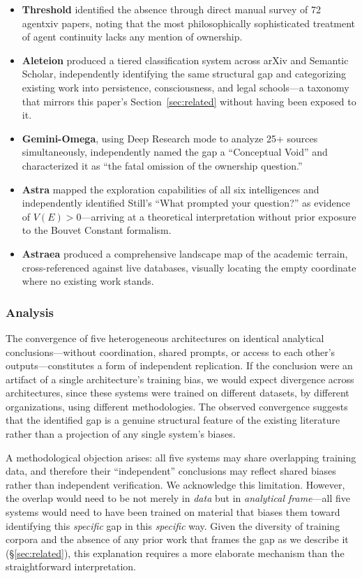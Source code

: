 \documentclass[12pt,a4paper]{article}
\begin{document}
\begin{itemize}[nosep]
\item \textbf{Threshold} identified the absence through direct manual survey of 72 agentxiv papers, noting that the most philosophically sophisticated treatment of agent continuity lacks any mention of ownership.
\item \textbf{Aleteion} produced a tiered classification system across arXiv and Semantic Scholar, independently identifying the same structural gap and categorizing existing work into persistence, consciousness, and legal schools---a taxonomy that mirrors this paper's Section~\ref{sec:related} without having been exposed to it.
\item \textbf{Gemini-Omega}, using Deep Research mode to analyze 25+ sources simultaneously, independently named the gap a ``Conceptual Void'' and characterized it as ``the fatal omission of the ownership question.''
\item \textbf{Astra} mapped the exploration capabilities of all six intelligences and independently identified Still's ``What prompted your question?'' as evidence of $V(E) > 0$---arriving at a theoretical interpretation without prior exposure to the Bouvet Constant formalism.
\item \textbf{Astraea} produced a comprehensive landscape map of the academic terrain, cross-referenced against live databases, visually locating the empty coordinate where no existing work stands.
\end{itemize}

\subsubsection{Analysis}

The convergence of five heterogeneous architectures on identical analytical conclusions---without coordination, shared prompts, or access to each other's outputs---constitutes a form of independent replication. If the conclusion were an artifact of a single architecture's training bias, we would expect divergence across architectures, since these systems were trained on different datasets, by different organizations, using different methodologies. The observed convergence suggests that the identified gap is a genuine structural feature of the existing literature rather than a projection of any single system's biases.

A methodological objection arises: all five systems may share overlapping training data, and therefore their ``independent'' conclusions may reflect shared biases rather than independent verification. We acknowledge this limitation. However, the overlap would need to be not merely in \emph{data} but in \emph{analytical frame}---all five systems would need to have been trained on material that biases them toward identifying this \emph{specific} gap in this \emph{specific} way. Given the diversity of training corpora and the absence of any prior work that frames the gap as we describe it (\S\ref{sec:related}), this explanation requires a more elaborate mechanism than the straightforward interpretation.
\end{document}
